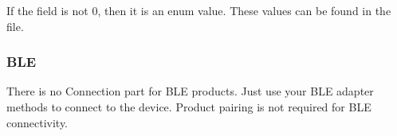 If the  field is not 0, then it is an  enum value. These values can be found in the\\
 file.

\subsubsection{BLE}

There is no Connection part for BLE products. Just use your BLE adapter methods to connect to the device. Product pairing is not required for BLE connectivity.

